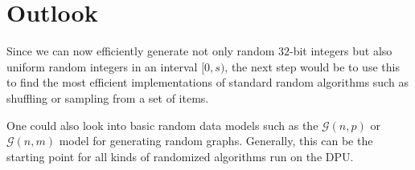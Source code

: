 \documentclass[a4paper]{scrartcl}
\begin{document}
\section{Outlook}
Since we can now efficiently generate not only random $32$-bit integers but also uniform random integers in an interval $[0,s)$, the next step would be to use this to find the most efficient implementations of standard random algorithms such as shuffling or sampling from a set of items.

One could also look into basic random data models such as the $\mathcal{G}(n,p)$ or $\mathcal{G}(n,m)$ model for generating random graphs.
Generally, this can be the starting point for all kinds of randomized algorithms run on the DPU.



\clearpage
\printbibliography
\end{document}
